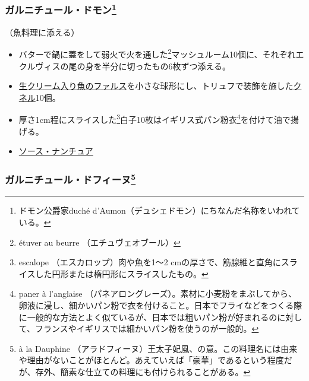 \begin{recette}
\atoaki{}

\hypertarget{garniture-Daumont}{%
\subsubsection[ガルニチュール・ドモン]{\texorpdfstring{ガルニチュール・ドモン\footnote{ドモン公爵家duché
  d'Aumon（デュシェドモン）にちなんだ名称をいわれている。}}{ガルニチュール・ドモン}}\label{garniture-Daumont}}



（魚料理に添える）

\begin{itemize}
\item
  バターで鍋に蓋をして弱火で火を通した\footnote{étuver au beurre
    （エチュヴェオブール）}マッシュルーム10個に、それぞれエクルヴィスの尾の身を半分に切ったもの6枚ずつ添える。
\item
  \protect\hyperlink{farce-c}{生クリーム入り魚のファルス}を小さな球形にし、トリュフで装飾を施した\protect\hyperlink{quenelles}{クネル}10個。
\item
  厚さ1cm程にスライスした\footnote{escalope （エスカロップ）肉や魚を1〜2
    cmの厚さで、筋腺維と直角にスライスした円形または楕円形にスライスしたもの。}白子10枚はイギリス式パン粉衣\footnote{paner
    à l'anglaise
    （パネアロングレーズ）。素材に小麦粉をまぶしてから、卵液に浸し、細かいパン粉で衣を付けること。日本でフライなどをつくる際に一般的な方法とよく似ているが、日本では粗いパン粉が好まれるのに対して、フランスやイギリスでは細かいパン粉を使うのが一般的。}を付けて油で揚げる。
\item
  \protect\hyperlink{sauce-nantua}{ソース・ナンチュア}
\end{itemize}

\atoaki{}

\hypertarget{garniture-dauphine}{%
\subsubsection[ガルニチュール・ドフィーヌ]{\texorpdfstring{ガルニチュール・ドフィーヌ\footnote{à
  la Dauphine
  （アラドフィーヌ）王太子妃風、の意。この料理名には由来や理由がないことがほとんど。あえていえば「豪華」であるという程度だが、存外、簡素な仕立ての料理にも付けられることがある。}}{ガルニチュール・ドフィーヌ}}\label{garniture-dauphine}}


\end{recette}
